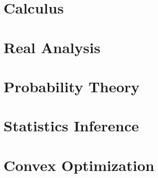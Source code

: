 \documentclass{elegantbook}
\begin{document}
\tableofcontents
\mainmatter
\hypersetup{pageanchor=true}

\part{Calculus}




\part{Real Analysis}




\part{Probability Theory}







\part{Statistics Inference}






\part{Convex Optimization}


\end{document}
